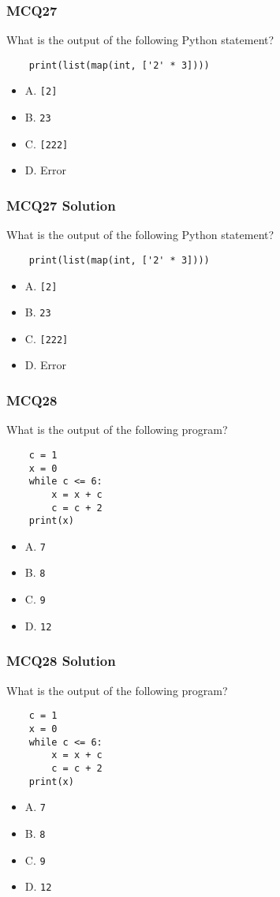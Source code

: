 \documentclass{beamer}
\begin{document}
\begin{frame}[fragile]
    \frametitle{MCQ27}
    What is the output of the following Python statement?
    \begin{verbatim}
    print(list(map(int, ['2' * 3])))
    \end{verbatim}
    \begin{itemize}
        \item A. \texttt{[2]}
        \item B. \texttt{23}
        \item C. \texttt{[222]}
        \item D. Error
    \end{itemize}
\end{frame}
\begin{frame}[fragile]
    \frametitle{MCQ27 Solution}
    What is the output of the following Python statement?
    \begin{verbatim}
    print(list(map(int, ['2' * 3])))
    \end{verbatim}
    \begin{itemize}
        \item A. \texttt{[2]}
        \item B. \texttt{23}
        \item C. \alert{\texttt{[222]}}
        \item D. Error
    \end{itemize}
\end{frame}

\begin{frame}[fragile]
    \frametitle{MCQ28}
    What is the output of the following program?
    \begin{verbatim}
    c = 1
    x = 0
    while c <= 6:
        x = x + c
        c = c + 2
    print(x)
    \end{verbatim}
    \begin{itemize}
        \item A. \texttt{7}
        \item B. \texttt{8}
        \item C. \texttt{9}
        \item D. \texttt{12}
    \end{itemize}
\end{frame}
\begin{frame}[fragile]
    \frametitle{MCQ28 Solution}
    What is the output of the following program?
    \begin{verbatim}
    c = 1
    x = 0
    while c <= 6:
        x = x + c
        c = c + 2
    print(x)
    \end{verbatim}
    \begin{itemize}
        \item A. \texttt{7}
        \item B. \texttt{8}
        \item \alert{C. \texttt{9}}
        \item D. \texttt{12}
    \end{itemize}
\end{frame}
\end{document}
